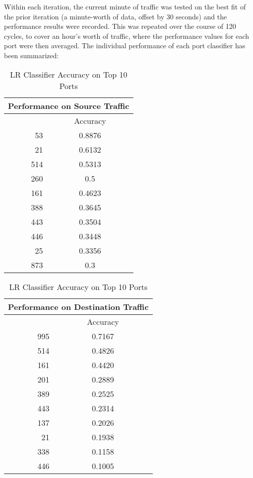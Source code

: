 Within each iteration, the current minute of traffic was tested on the best fit of the prior iteration (a minute-worth of data, offset by 30 seconds) and the performance results were recorded. This was repeated over the course of 120 cycles, to cover an hour's worth of traffic, where the performance values for each port were then averaged. The individual performance of each port classifier has been summarized:

\begin{table}[!htb]
    \caption{LR Classifier Accuracy on Top 10 Ports}
    \label{t:accuracy}
    \begin{minipage}{.51\linewidth}
      \centering
\begin{tabular}{rc}
\hline
\multicolumn{2}{l}{Performance on Source Traffic} \\ \hline
\rowcolor[HTML]{EFEFEF} 
\multicolumn{1}{c}{\cellcolor[HTML]{EFEFEF}Port} & Accuracy \\ \hline
53 & 0.8876 \\
21 & 0.6132 \\
514 & 0.5313 \\
260 & 0.5 \\
161 & 0.4623 \\
388 & 0.3645 \\
443 & 0.3504 \\
446 & 0.3448 \\
25 & 0.3356 \\
873 & 0.3 \\ \hline
\end{tabular}
    \end{minipage}%
    \begin{minipage}{.51\linewidth}
      \centering
\begin{tabular}{rc}
\hline
\multicolumn{2}{l}{Performance on Destination Traffic} \\ \hline
\rowcolor[HTML]{EFEFEF} 
\multicolumn{1}{c}{\cellcolor[HTML]{EFEFEF}Port} & Accuracy \\ \hline
995 & 0.7167 \\
514 & 0.4826 \\
161 & 0.4420 \\
201 & 0.2889 \\
389 & 0.2525 \\
443 & 0.2314 \\
137 & 0.2026 \\
21 & 0.1938 \\
338 & 0.1158 \\
446 & 0.1005 \\ \hline
\end{tabular}
    \end{minipage} 
\end{table}

